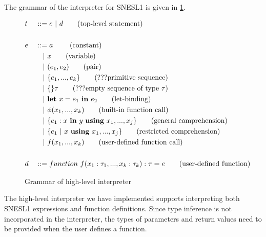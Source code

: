 The grammar of the interpreter for SNESL1 is given in \ref{fig-mysnesl}. 
 

\begin{figure}[H]\large
	\begin{alignat*}{2}
	& t &&::= e \ | \ d  \tag{top-level statement} \\
	\\
	& e &&::=  a \     \tag{constant} \\
	&   && \quad | \ x  \tag{variable} \\
	&   && \quad | \ (e_1,e_2) \tag{pair}\\
	&   && \quad | \ \{e_1,...,e_k \}	\tag{???primitive sequence} \\
	&   && \quad | \ \{ \}\tau			\tag{???empty sequence of type $\tau$} \\
	&   && \quad | \ \mathbf{let} \ x = e_1 \ \mathbf{in} \ e_2 \tag{let-binding}\\
	&   && \quad | \ \phi{(x_1,...,x_k)}  \tag{built-in function call} \\
	&   && \quad | \ \{e_1 : x \ \mathbf{in} \ y \ \mathbf{using} \ x_1,...,x_j\} \tag{general comprehension} \\
	&   && \quad | \ \{ e_1 \ | \ x \ \mathbf{using} \ x_1,...,x_j \} \tag {restricted comprehension} \\
	&   && \quad | \ f(x_1,...,x_k)  \tag {user-defined function call} \\
	\\
	& d &&::= function \  f(x_1: \tau_1, ..., x_k: \tau_k): \tau = e  \tag{user-defined function}
	\end{alignat*}
	\caption{Grammar of high-level interpreter \label{fig-mysnesl}}
\end{figure}

The high-level interpreter we have implemented supports interpreting both SNESL1 expressions and function definitions. 
Since type inference is not incorporated in the interpreter, the types of  parameters and return values need to be provided when the user defines a function.

